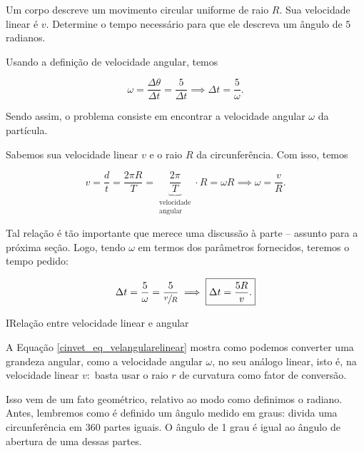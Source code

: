 \begin{exemplo}[Nível II]\label{exemplo_cinvet_velocidadeangularex02}

Um corpo descreve um movimento circular uniforme de raio $R$. Sua velocidade linear é $v$. Determine o tempo necessário para que ele descreva um ângulo de $5$ radianos.


\resolucao

Usando a definição de velocidade angular, temos

$$ \omega = \dfrac{\Delta \theta}{\Delta t} = \dfrac{5}{\Delta t} \implies \Delta t = \dfrac{5}{\omega}.$$

Sendo assim, o problema consiste em encontrar a velocidade angular $\omega$ da partícula.

Sabemos sua velocidade linear $v$ e o raio $R$ da circunferência. Com isso, temos

$$ v = \dfrac{d}{t}=\dfrac{2 \pi R}{T} = \underbrace{\dfrac{2 \pi}{T}}_{\substack{\text{velocidade}\\\text{angular}}}\cdot R = \omega R \implies \omega = \dfrac{v}{R}.$$

Tal relação é tão importante que merece uma discussão à parte -- assunto para a próxima seção. Logo, tendo $\omega$ em termos dos parâmetros fornecidos, teremos o tempo pedido:

$$ \Delta t = \dfrac{5}{\omega} = \dfrac{5}{\sfrac{v}{R}} \implies \boxed{\Delta t = \dfrac{5R}{v} .} $$





\end{exemplo}





\begin{secnivel}{I}{Relação entre velocidade linear e angular}
  

\end{secnivel}







A Equação \eqref{cinvet_eq_velangularelinear} mostra como podemos converter uma grandeza angular, como a velocidade angular $\omega$, no seu análogo linear, isto é, na velocidade linear $v:$ basta usar o raio $r$ de curvatura como fator de conversão.

Isso vem de um fato geométrico, relativo ao modo como definimos o radiano. Antes, lembremos como é definido um ângulo medido em graus: divida uma circunferência em 360 partes iguais. O ângulo de 1 grau é igual ao ângulo de abertura de uma dessas partes.

